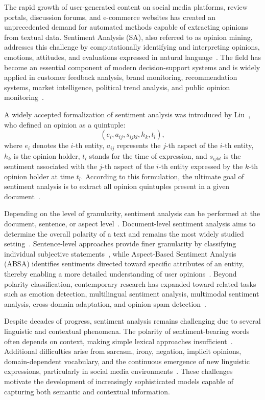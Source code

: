 \documentclass[a4paper,fleqn]{cas-dc}
\begin{document}
The rapid growth of user-generated content on social media platforms, review portals, discussion forums, and e-commerce websites has created an unprecedented demand for automated methods capable of extracting opinions from textual data. Sentiment Analysis (SA), also referred to as opinion mining, addresses this challenge by computationally identifying and interpreting opinions, emotions, attitudes, and evaluations expressed in natural language~\cite{Liu2012sentiment}. The field has become an essential component of modern decision-support systems and is widely applied in customer feedback analysis, brand monitoring, recommendation systems, market intelligence, political trend analysis, and public opinion monitoring~\cite{behdenna2018document, sharma2025review}.

A widely accepted formalization of sentiment analysis was introduced by Liu~\cite{Liu2012sentiment}, who defined an opinion as a quintuple:
%
\begin{equation}
	\left(e_i, a_{ij}, s_{ijkl}, h_k, t_l\right),
\end{equation}
%
where $e_i$ denotes the $i$-th entity, $a_{ij}$ represents the $j$-th aspect of the $i$-th entity, $h_k$ is the opinion holder, $t_l$ stands for the time of expression, and $s_{ijkl}$ is the sentiment associated with the $j$-th aspect of the $i$-th entity expressed by the $k$-th opinion holder at time $t_l$. According to this formulation, the ultimate goal of sentiment analysis is to extract all opinion quintuples present in a given document~\cite{Liu2012sentiment}.

Depending on the level of granularity, sentiment analysis can be performed at the document, sentence, or aspect level~\cite{azzeddine2018sentiment}. Document-level sentiment analysis aims to determine the overall polarity of a text and remains the most widely studied setting~\cite{behdenna2018document, ravi2015survey}. Sentence-level approaches provide finer granularity by classifying individual subjective statements~\cite{CHATURVEDI201865}, while Aspect-Based Sentiment Analysis (ABSA) identifies sentiments directed toward specific attributes of an entity, thereby enabling a more detailed understanding of user opinions~\cite{yadav2020sentiment, sharma2025review}. Beyond polarity classification, contemporary research has expanded toward related tasks such as emotion detection, multilingual sentiment analysis, multimodal sentiment analysis, cross-domain adaptation, and opinion spam detection~\cite{sharma2025review}.

Despite decades of progress, sentiment analysis remains challenging due to several linguistic and contextual phenomena. The polarity of sentiment-bearing words often depends on context, making simple lexical approaches insufficient~\cite{behdenna2018document}. Additional difficulties arise from sarcasm, irony, negation, implicit opinions, domain-dependent vocabulary, and the continuous emergence of new linguistic expressions, particularly in social media environments~\cite{behdenna2018document, islam2024challenges, sharma2025review}. These challenges motivate the development of increasingly sophisticated models capable of capturing both semantic and contextual information.
\end{document}
